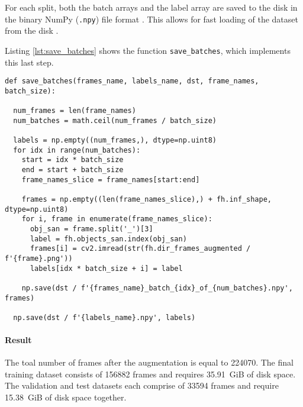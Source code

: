 For each split, both the batch arrays and the label array are saved to the disk in the binary NumPy (\texttt{.npy}) file format \cite{training_numpy_format}.
This allows for fast loading of the dataset from the disk \cite{training_numpy_npy}.

Listing \ref{lst:save_batches} shows the function \texttt{save\_batches}, which implements this last step.

\begin{lstlisting}[style=python, caption={Python function \texttt{save\_batches} to save the batch arrays and the label array}, label=lst:save_batches]
def save_batches(frames_name, labels_name, dst, frame_names, batch_size):

  num_frames = len(frame_names)
  num_batches = math.ceil(num_frames / batch_size)

  labels = np.empty((num_frames,), dtype=np.uint8)
  for idx in range(num_batches):
    start = idx * batch_size
    end = start + batch_size
    frame_names_slice = frame_names[start:end]

    frames = np.empty((len(frame_names_slice),) + fh.inf_shape, dtype=np.uint8)
    for i, frame in enumerate(frame_names_slice):
      obj_san = frame.split('_')[3]
      label = fh.objects_san.index(obj_san)
      frames[i] = cv2.imread(str(fh.dir_frames_augmented / f'{frame}.png'))
      labels[idx * batch_size + i] = label

    np.save(dst / f'{frames_name}_batch_{idx}_of_{num_batches}.npy', frames)

  np.save(dst / f'{labels_name}.npy', labels)
\end{lstlisting}

\paragraph{Result}
The toal number of frames after the augmentation is equal to \num{224070}.
The final training dataset consists of \num{156882} frames and requires \SI{35.91}{GiB} of disk space.
The validation and test datasets each comprise of \num{33594} frames and require \SI{15.38}{GiB} of disk space together.




